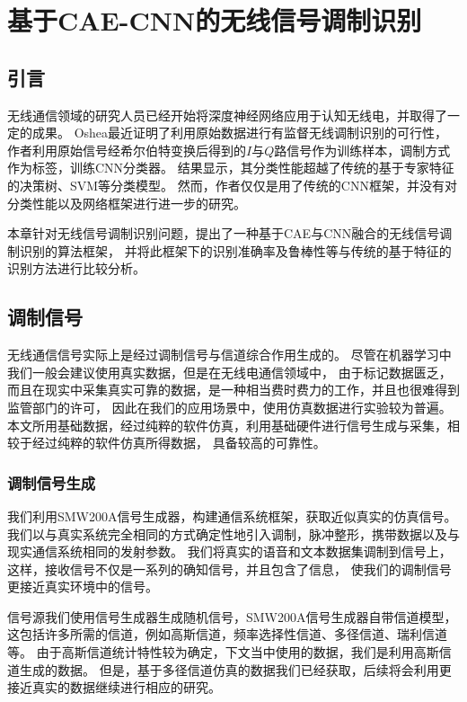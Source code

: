 \chapter{基于CAE-CNN的无线信号调制识别}

\section{引言}

无线通信领域的研究人员已经开始将深度神经网络应用于认知无线电，并取得了一定的成果\cite{migliori2016biologically}\cite{schmidt2017wireless}\cite{oshea2016convolutional}。
Oshea最近证明了利用原始数据进行有监督无线调制识别的可行性，
作者利用原始信号经希尔伯特变换后得到的$I$与$Q$路信号作为训练样本，调制方式作为标签，训练CNN分类器。
结果显示，其分类性能超越了传统的基于专家特征的决策树、SVM等分类模型。
然而，作者仅仅是用了传统的CNN框架，并没有对分类性能以及网络框架进行进一步的研究。\par

本章针对无线信号调制识别问题，提出了一种基于CAE与CNN融合的无线信号调制识别的算法框架，
并将此框架下的识别准确率及鲁棒性等与传统的基于特征的识别方法进行比较分析。\par

\section{调制信号}

无线通信信号实际上是经过调制信号与信道综合作用生成的。
尽管在机器学习中我们一般会建议使用真实数据，但是在无线电通信领域中，
由于标记数据匮乏，而且在现实中采集真实可靠的数据，是一种相当费时费力的工作，并且也很难得到监管部门的许可，
因此在我们的应用场景中，使用仿真数据进行实验较为普遍。
本文所用基础数据，经过纯粹的软件仿真，利用基础硬件进行信号生成与采集，相较于经过纯粹的软件仿真所得数据，
具备较高的可靠性。\par
\subsection{调制信号生成}
我们利用SMW200A信号生成器，构建通信系统框架，获取近似真实的仿真信号。
我们以与真实系统完全相同的方式确定性地引入调制，脉冲整形，携带数据以及与现实通信系统相同的发射参数。 
我们将真实的语音和文本数据集调制到信号上，这样，接收信号不仅是一系列的确知信号，并且包含了信息，
使我们的调制信号更接近真实环境中的信号。\par

信号源我们使用信号生成器生成随机信号，SMW200A信号生成器自带信道模型，这包括许多所需的信道，例如高斯信道，频率选择性信道、多径信道、瑞利信道等。
由于高斯信道统计特性较为确定，下文当中使用的数据，我们是利用高斯信道生成的数据。
但是，基于多径信道仿真的数据我们已经获取，后续将会利用更接近真实的数据继续进行相应的研究。\par

